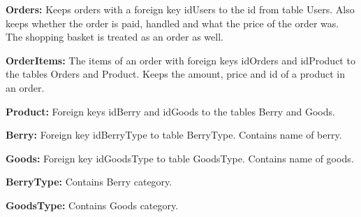 \noindent\textbf{Orders:} Keeps orders with a foreign key idUsers to the
id from table Users. Also keeps whether the order is paid, handled and what
the price of the order was. The shopping basket is treated as an order as well.

\noindent\textbf{OrderItems:} The items of an order with foreign keys
idOrders and idProduct to the tables Orders and Product.  Keeps the amount,
price and id of a product in an order.

\noindent\textbf{Product:} Foreign keys idBerry and idGoods to the tables
Berry and Goods.

\noindent\textbf{Berry:} Foreign key idBerryType to table BerryType. Contains
name of berry.

\noindent\textbf{Goods:} Foreign key idGoodsType to table GoodsType. Contains
name of goods.

\noindent\textbf{BerryType:} Contains Berry category.

\noindent\textbf{GoodsType:} Contains Goods category.
